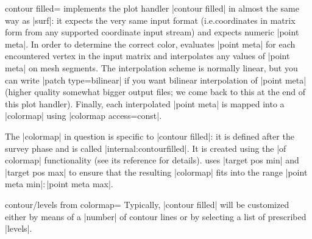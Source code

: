 {{\begin{plottype}[/pgfplots]{
    contour filled=\textcolor{black}{}%
}
    \PGFPlots{} implements the plot handler |contour filled| in almost the same
    way as |surf|: it expects the very same input format (i.e.\@ coordinates in
    matrix form from any supported coordinate input stream) and expects numeric
    |point meta|. In order to determine the correct color, \PGFPlots{}
    evaluates |point meta| for each encountered vertex in the input matrix and
    interpolates any values of |point meta| on mesh segments. The interpolation
    scheme is normally linear, but you can write |patch type=bilinear| if you
    want bilinear interpolation of |point meta| (higher quality somewhat bigger
    output files; we come back to this at the end of this plot handler).
    Finally, each interpolated |point meta| is mapped into a |colormap| using
    |colormap access=const|.

    The |colormap| in question is specific to |contour filled|: it is defined
    after the survey phase and is called |internal:contourfilled|. It is
    created using the |of colormap| functionality (see its reference for
    details). \PGFPlots{} uses |target pos min| and |target pos max| to ensure
    that the resulting |colormap| fits into the range
    |point meta min|$:$|point meta max|.

    \begin{pgfplotskey}{contour/levels from colormap=}
        Typically, |contour filled| will be customized either by means of a
        |number| of contour lines or by selecting a list of prescribed
        |levels|.


\end{pgfplotskey}
\end{plottype}}}
